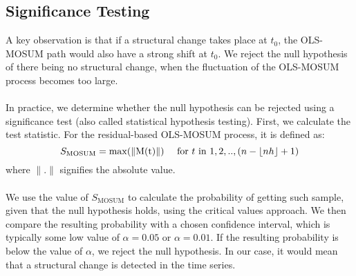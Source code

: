 \documentclass[main.tex]{subfiles}
\begin{document}
\subsection{Significance Testing}
\label{subsec:significance_testing}
A key observation is that if a structural change takes place at $t_0$, the
OLS-MOSUM path would also have a strong shift at $t_0$.
We reject the null hypothesis of there being no structural change, when the fluctuation of
the OLS-MOSUM process becomes too large.\\\\
In practice, we determine whether the null
hypothesis can be rejected using a significance test (also called statistical
hypothesis testing).
First, we calculate the test statistic. For the residual-based OLS-MOSUM
process, it is defined as:
\begin{equation} \label{eq:test_statistic}
  S_{\text{MOSUM}} = \max(\|\text{M(t)}\|) \quad \text{ for } t \text{ in } 1,2,..,(n - \lfloor nh\rfloor + 1)
\end{equation}
where $\| . \|$ signifies the absolute value.\\\\
We use the value of $S_{\text{MOSUM}}$ to calculate the probability of getting such
sample, given that the null hypothesis holds, using the critical values approach.
We then compare the resulting
probability with a chosen confidence interval, which is typically some low value
of $\alpha = 0.05$ or $\alpha = 0.01$. If the resulting probability is below the
value of $\alpha$, we reject the null hypothesis. 
In our case, it would mean that a
structural change is detected in the time series. 
\end{document}
